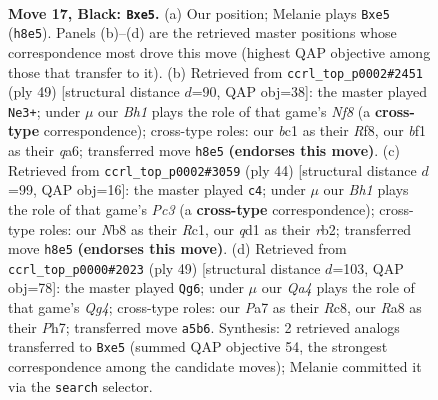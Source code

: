 \documentclass[11pt]{article}
\begin{document}
\clearpage

\begin{figure}[p]\centering
\begin{subfigure}{0.46\textwidth}\centering
\resizebox{\linewidth}{!}{%
\newchessgame
\chessboard[
  setfen={rnb1k2b/pp6/6p1/q3P1P1/8/3p4/P4K2/R1BQ1BN1 b q - 0 17},
  showmover=false,
  pgfstyle=straightmove, color=movearrow, markmove={h8-e5}
]}
\caption{}
\end{subfigure}\hfill
\begin{subfigure}{0.46\textwidth}\centering
\resizebox{\linewidth}{!}{%
\newchessgame
\chessboard[
  setfen={B4r1k/p5p1/Qp2p3/2p3q1/6P1/2B5/P3N1PP/2RK1n2 b - - 0 25},
  showmover=false,
  pgfstyle=straightmove, color=movearrow, markmove={f1-e3}
]}
\caption{}
\end{subfigure}
\\[4pt]
\begin{subfigure}{0.46\textwidth}\centering
\resizebox{\linewidth}{!}{%
\newchessgame
\chessboard[
  setfen={3B2k1/p4pbp/6p1/3B4/P7/2P3P1/1rb2P1P/2R3K1 w - - 3 23},
  showmover=false,
  pgfstyle=straightmove, color=movearrow, markmove={c3-c4}
]}
\caption{}
\end{subfigure}\hfill
\begin{subfigure}{0.46\textwidth}\centering
\resizebox{\linewidth}{!}{%
\newchessgame
\chessboard[
  setfen={2r3k1/1b3ppp/p2Q4/6q1/3B4/4PP1P/6P1/5RK1 b - - 2 25},
  showmover=false,
  pgfstyle=straightmove, color=movearrow, markmove={g5-g6}
]}
\caption{}
\end{subfigure}
\caption{\textbf{Move 17, Black: \texttt{Bxe5}.} (a) Our position; Melanie plays \texttt{Bxe5} (\texttt{h8e5}). Panels (b)--(d) are the retrieved master positions whose correspondence most drove this move (highest QAP objective among those that transfer to it). (b) Retrieved from \texttt{ccrl\_top\_p0002\#2451} (ply 49) [structural distance $d$=90, QAP obj=38]: the master played \texttt{Ne3+}; under $\mu$ our \emph{Bh1} plays the role of that game's \emph{Nf8} (a \textbf{cross-type} correspondence); cross-type roles: our \emph{b}c1 as their \emph{R}f8, our \emph{b}f1 as their \emph{q}a6; transferred move \texttt{h8e5} \textbf{(endorses this move)}. (c) Retrieved from \texttt{ccrl\_top\_p0002\#3059} (ply 44) [structural distance $d$=99, QAP obj=16]: the master played \texttt{c4}; under $\mu$ our \emph{Bh1} plays the role of that game's \emph{Pc3} (a \textbf{cross-type} correspondence); cross-type roles: our \emph{N}b8 as their \emph{R}c1, our \emph{q}d1 as their \emph{r}b2; transferred move \texttt{h8e5} \textbf{(endorses this move)}. (d) Retrieved from \texttt{ccrl\_top\_p0000\#2023} (ply 49) [structural distance $d$=103, QAP obj=78]: the master played \texttt{Qg6}; under $\mu$ our \emph{Qa4} plays the role of that game's \emph{Qg4}; cross-type roles: our \emph{P}a7 as their \emph{R}c8, our \emph{R}a8 as their \emph{P}h7; transferred move \texttt{a5b6}. Synthesis: 2 retrieved analogs transferred to \texttt{Bxe5} (summed QAP objective 54, the strongest correspondence among the candidate moves); Melanie committed it via the \texttt{search} selector.}
\label{fig:thought-m33}
\end{figure}
\end{document}
